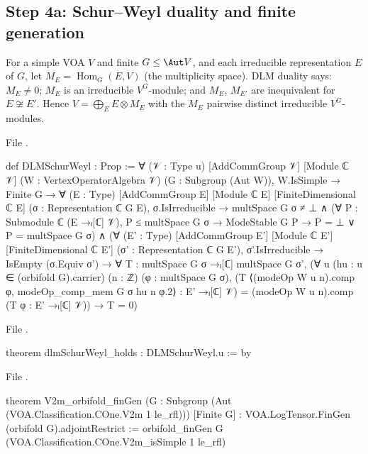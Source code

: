 \subsection{Step 4a: Schur--Weyl duality and finite generation}

\begin{definition}\label{l22:def:dlm}
For a simple VOA $V$ and finite $G\le\Aut V$, and each irreducible representation $E$ of $G$, let
$M_E=\operatorname{Hom}_G(E,V)$ (the multiplicity space). DLM duality says: $M_E\ne0$; $M_E$ is an irreducible
$V^G$-module; and $M_E$, $M_{E'}$ are inequivalent for $E\not\cong E'$. Hence $V=\bigoplus_E E\otimes M_E$ with the
$M_E$ pairwise distinct irreducible $V^G$-modules.
\end{definition}
\noindent File .
\begin{leancode}
def DLMSchurWeyl : Prop :=
  ∀ (𝒱 : Type u) [AddCommGroup 𝒱] [Module ℂ 𝒱] (W : VertexOperatorAlgebra 𝒱)
    (G : Subgroup (Aut W)), W.IsSimple → Finite G →
    ∀ (E : Type) [AddCommGroup E] [Module ℂ E] [FiniteDimensional ℂ E]
      (σ : Representation ℂ G E), σ.IsIrreducible →
      multSpace G σ ≠ ⊥ ∧
      (∀ P : Submodule ℂ (E →ₗ[ℂ] 𝒱), P ≤ multSpace G σ → ModeStable G P →
        P = ⊥ ∨ P = multSpace G σ) ∧
      (∀ (E' : Type) [AddCommGroup E'] [Module ℂ E'] [FiniteDimensional ℂ E']
        (σ' : Representation ℂ G E'), σ'.IsIrreducible → IsEmpty (σ.Equiv σ') →
        ∀ T : multSpace G σ →ₗ[ℂ] multSpace G σ',
          (∀ u (hu : u ∈ (orbifold G).carrier) (n : ℤ) (φ : multSpace G σ),
            (T ⟨(modeOp W u n).comp φ, modeOp_comp_mem G σ hu n φ.2⟩ : E' →ₗ[ℂ] 𝒱) =
              (modeOp W u n).comp (T φ : E' →ₗ[ℂ] 𝒱)) → T = 0)
\end{leancode}
\noindent File .
\begin{leancode}
theorem dlmSchurWeyl_holds : DLMSchurWeyl.{u} := by
\end{leancode}
\noindent File .
\begin{leancode}
theorem V2m_orbifold_finGen
    (G : Subgroup (Aut (VOA.Classification.COne.V2m 1 le_rfl))) [Finite G] :
    VOA.LogTensor.FinGen (orbifold G).adjointRestrict :=
  orbifold_finGen G (VOA.Classification.COne.V2m_isSimple 1 le_rfl)
\end{leancode}


